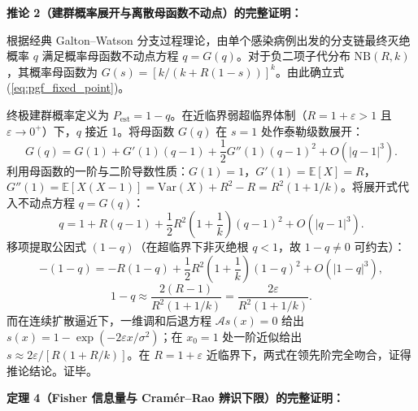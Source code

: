 \documentclass[11pt,a4paper]{article}
\theoremstyle{plain}
\theoremstyle{definition}
\begin{document}
\noindent\textbf{推论 2（建群概率展开与离散母函数不动点）的完整证明：}

根据经典 Galton--Watson 分支过程理论\citep{athreya1972branching, whittle1955outcome}，由单个感染病例出发的分支链最终灭绝概率 $q$ 满足概率母函数不动点方程 $q = G(q)$。对于负二项子代分布 $\text{NB}(R, k)$，其概率母函数为 $G(s) = [k/(k+R(1-s))]^k$。由此确立式 (\ref{eq:pgf_fixed_point})。

终极建群概率定义为 $P_{\text{est}} = 1 - q$。在近临界弱超临界体制（$R = 1 + \varepsilon > 1$ 且 $\varepsilon \to 0^+$）下，$q$ 接近 1。将母函数 $G(q)$ 在 $s=1$ 处作泰勒级数展开：
\begin{equation}
G(q) = G(1) + G'(1)(q-1) + \frac{1}{2}G''(1)(q-1)^2 + O(|q-1|^3).
\end{equation}
利用母函数的一阶与二阶导数性质：$G(1) = 1$，$G'(1) = \mathbb{E}[X] = R$，$G''(1) = \mathbb{E}[X(X-1)] = \text{Var}(X) + R^2 - R = R^2(1 + 1/k)$。将展开式代入不动点方程 $q = G(q)$：
\begin{equation}
q = 1 + R(q-1) + \frac{1}{2} R^2\left(1 + \frac{1}{k}\right)(q-1)^2 + O(|q-1|^3).
\end{equation}
移项提取公因式 $(1-q)$（在超临界下非灭绝根 $q < 1$，故 $1-q \neq 0$ 可约去）：
\begin{equation}
-(1-q) = - R (1-q) + \frac{1}{2} R^2\left(1 + \frac{1}{k}\right)(1-q)^2 + O(|1-q|^3),
\end{equation}
\begin{equation}
1-q \approx \frac{2(R-1)}{R^2(1 + 1/k)} = \frac{2\varepsilon}{R^2(1 + 1/k)}.
\end{equation}
而在连续扩散逼近下，一维调和后退方程 $\mathcal{A} s(x) = 0$ 给出 $s(x) = 1 - \exp(-2\varepsilon x / \sigma^2)$；在 $x_0=1$ 处一阶近似给出 $s \approx 2\varepsilon / [R(1+R/k)]$。在 $R = 1 + \varepsilon$ 近临界下，两式在领先阶完全吻合，证得推论结论。证毕。

\vspace{0.8em}
\noindent\textbf{定理 4（Fisher 信息量与 Cram\'er--Rao 辨识下限）的完整证明：}
\end{document}
